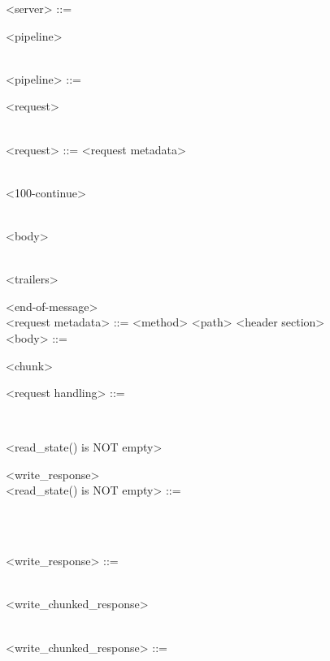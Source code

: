 \documentclass{article}
\begin{document}
\begin{syntdiag}
<server> ::= \begin{rep} <pipeline> \end{rep}
\\
<pipeline> ::= \begin{rep} <request> \end{rep}
\\
<request> ::= <request metadata> \begin{stack} \\ <100-continue> \end{stack} \begin{stack} \\ <body> \end{stack} \begin{stack} \\ <trailers> \end{stack} <end-of-message>
\\
<request metadata> ::= <method> <path> <header section>
\\
<body> ::= \begin{rep} <chunk> \end{rep}
\end{syntdiag}

\begin{syntdiag}
<request handling> ::=   \begin{stack} \\   \end{stack} \begin{rep} <read_state() is NOT empty> \end{rep}  <write_response>
\\
<read_state() is NOT empty> ::= \begin{stack}   \\   \end{stack}
\\
<write_response> ::= \begin{stack}  \\  <write_chunked_response> \end{stack}
\\
<write_chunked_response> ::=   \begin{rep}  \end{rep} \begin{stack}  \\  \end{stack}
\end{syntdiag}
\end{document}
